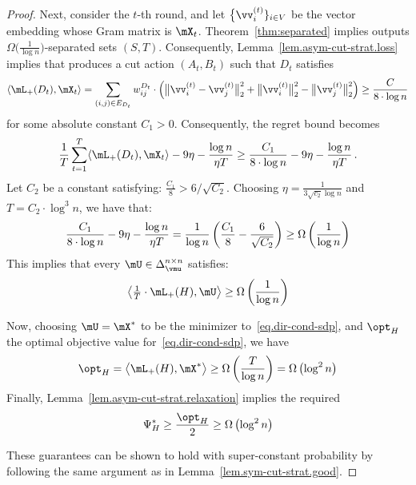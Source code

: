 \documentclass[letterpaper]{article}
\begin{document}
\begin{proof}
Next, consider the $t$-th round, and let $\big\{ \vv_i^{(t)} \}_{i \in V}$ be the vector embedding whose Gram matrix is $\mX_t$. Theorem~\ref{thm:separated}
implies \roundcut outputs $\Omega\big( \frac{1}{\log n} \big)$-separated sets $(S, T)$. Consequently, Lemma~\ref{lem.asym-cut-strat.loss} implies that \dirroundcut produces a cut action $(A_t, B_t)$ such that $D_t$ satisfies
\begin{equation*}
\langle \mL_{+}(D_t), \mX_t \rangle
= \sum_{(i, j) \in E_{D_t}} w_{ij}^{D_t} \cdot \Big( \big\lVert \vv_i^{(t)} - \vv_j^{(t)} \big\rVert_2^2 + \big\lVert \vv_i^{(t)} \big\rVert_2^2 - \big\lVert \vv_j^{(t)} \big\rVert_2^2 \Big)
\geq \frac{C}{8 \cdot \log n}
\end{equation*}
for some absolute constant $C_1 > 0$. Consequently, the regret bound becomes
\begin{equation*}
\frac{1}{T} \sum_{t=1}^T \langle \mL_{+}(D_t), \mX_t \rangle - 9 \eta - \frac{\log n}{\eta T}
\geq \frac{C_1}{8 \cdot \log n}  - 9 \eta - \frac{\log n}{\eta T} \, .
\end{equation*}
Let $C_2$ be a constant satisfying: $\frac{C_1}{8} > 6/\sqrt{C_2}$. Choosing $\eta = \frac{1}{3 \sqrt{c_2} \log n}$ and $T = C_2 \cdot \log^3 n$, we have that:
\begin{equation*}
\frac{C_1}{8 \cdot \log n} - 9 \eta - \frac{\log n}{\eta T}
= {1
\over \log n} \left({C_1 \over 8}- {6 \over \sqrt{C_2}}\right) \geq \Omega\left({1 \over \log n}\right)
\end{equation*}
This implies that every $\mU \in \Delta_{\vmu}^{n \times n}$ satisfies:
\begin{equation*}
\big\langle \tfrac{1}{T} \cdot \mL_{+}(H), \mU \big\rangle
\geq \Omega\left({1\over \log n}\right)
\end{equation*}

Now, choosing $\mU = \mX^*$ to be the minimizer to~\eqref{eq.dir-cond-sdp}, and $\opt_H$ the optimal objective value for~\eqref{eq.dir-cond-sdp}, we have
\begin{equation*}
\opt_H
= \big\langle \mL_{+}(H), \mX^* \big\rangle
\geq \Omega\left({T \over \log n}\right) = \Omega\left({\log^2n}\right)
\end{equation*}
Finally, Lemma~\ref{lem.asym-cut-strat.relaxation} implies the required
\begin{equation*}
\Psi_H^* \geq \frac{\opt_H}{2} \geq \Omega\left({\log^2n}\right)
\end{equation*}

These guarantees can be shown to hold with super-constant probability by following the same argument as in Lemma~\ref{lem.sym-cut-strat.good}.
\end{proof}
\end{document}
